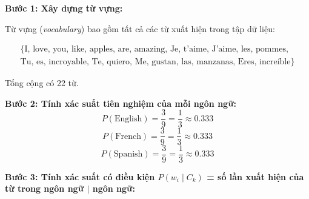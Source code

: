 \textbf{Bước 1: Xây dựng từ vựng:}

Từ vựng (\textit{vocabulary}) bao gồm tất cả các từ xuất hiện trong tập dữ liệu:

\begin{multline*}
\{\text{I, love, you, like, apples, are, amazing, Je, t’aime, J’aime, les, pommes,} \\
\text{Tu, es, incroyable, Te, quiero, Me, gustan, las, manzanas, Eres, increíble}\}
\end{multline*}

Tổng cộng có 22 từ.

\textbf{Bước 2: Tính xác suất tiên nghiệm của mỗi ngôn ngữ:}
\[
P(\text{English}) = \frac{3}{9} = \frac{1}{3} \approx 0.333
\]
\[
P(\text{French}) = \frac{3}{9} = \frac{1}{3} \approx 0.333
\]
\[
P(\text{Spanish}) = \frac{3}{9} = \frac{1}{3} \approx 0.333
\]

\textbf{Bước 3: Tính xác suất có điều kiện \( P(w_i \mid C_k) \) = số lần xuất hiện của từ trong ngôn ngữ \(\mid \) ngôn ngữ:}

